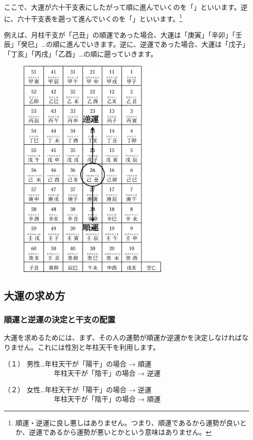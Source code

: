 \documentclass[a5paper,11pt,dvipdfmx]{tarticle}
\begin{document}
ここで、大運が六十干支表にしたがって順に進んでいくのを「」といいます。逆に、六十干支表を遡って進んでいくのを「」といいます。\footnote{順運・逆運に良し悪しはありません。つまり、順運であるから運勢が良いとか、逆運であるから運勢が悪いとかという意味はありません。}

例えば、月柱干支が「己丑」の順運であった場合、大運は「庚寅」「辛卯」「壬辰」「癸巳」…の順に進んでいきます。逆に、逆運であった場合、大運は「戊子」「丁亥」「丙戌」「乙酉」…の順に遡っていきます。

\begin{figure}[h]
  \centering
  \includegraphics[width=75mm,angle=90]{figs/figure4-1.eps}
\end{figure}

\subsection{大運の求め方}
\subsubsection*{順運と逆運の決定と干支の配置}
大運を求めるためには、まず、その人の運勢が順運か逆運かを決定しなければなりません。これには性別と年柱天干を利用します。

（１）	男性…年柱天干が「陽干」の場合 → 順運\\
　　　　　　　 年柱天干が「陰干」の場合 → 逆運

（２）	女性…年柱天干が「陽干」の場合 → 逆運\\
　　　　　　　 年柱天干が「陰干」の場合 → 順運\\
\end{document}
